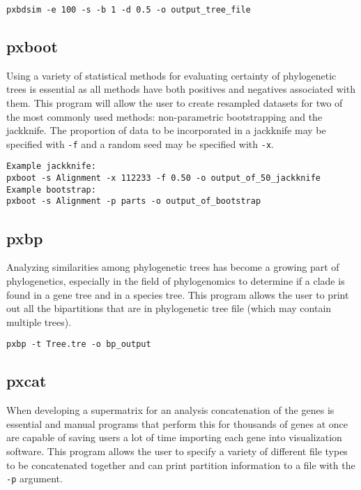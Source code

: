 \documentclass[12pt,letterpaper]{memoir}
\begin{document}
\begin{flushleft}
\begin{verbatim}
pxbdsim -e 100 -s -b 1 -d 0.5 -o output_tree_file
\end{verbatim}
\end{flushleft}

\subsection{pxboot}

Using a variety of statistical methods for evaluating certainty of phylogenetic trees is essential as all methods have both positives and negatives associated with them. This program will allow the user to create resampled datasets for two of the most commonly used methods: non-parametric bootstrapping and the jackknife. The proportion of data to be incorporated in a jackknife may be specified with \texttt{-f} and a random seed may be specified with \texttt{-x}.
\begin{flushleft}
\begin{verbatim}
Example jackknife:
pxboot -s Alignment -x 112233 -f 0.50 -o output_of_50_jackknife
Example bootstrap:
pxboot -s Alignment -p parts -o output_of_bootstrap
\end{verbatim}
\end{flushleft}

\subsection{pxbp}

Analyzing similarities among phylogenetic trees has become a growing part of phylogenetics, especially in the field of phylogenomics to determine if a clade is found in a gene tree and in a species tree. This program allows the user to print out all the bipartitions that are in phylogenetic tree file (which may contain multiple trees).

\begin{flushleft}
\begin{verbatim}
pxbp -t Tree.tre -o bp_output
\end{verbatim}
\end{flushleft}

\subsection{pxcat}

When developing a supermatrix for an analysis concatenation of the genes is essential and manual programs that perform this for thousands of genes at once are capable of saving users a lot of time importing each gene into visualization software. This program allows the user to specify a variety of different file types to be concatenated together and can print partition information to a file with the \texttt{-p} argument.
\end{document}
